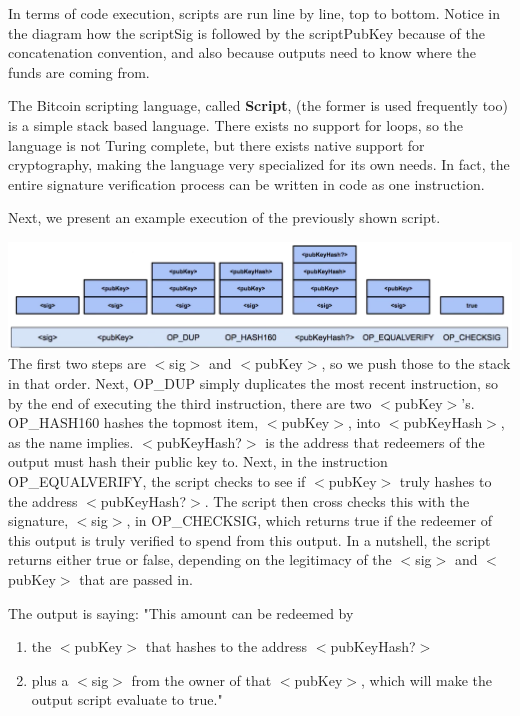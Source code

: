 \documentclass[full.tex]{subfiles}
\begin{document}
  In terms of code execution, scripts are run line by line, top to bottom. Notice in the diagram how the scriptSig is followed by the scriptPubKey because of the concatenation convention, and also because outputs need to know where the funds are coming from. 
  
  The Bitcoin scripting language, called \textbf{Script}, (the former is used frequently too) is a simple stack based language. There exists no support for loops, so the language is not Turing complete, but there exists native support for cryptography, making the language very specialized for its own needs. In fact, the entire signature verification process can be written in code as one instruction.
  
  Next, we present an example execution of the previously shown script. 

\includegraphics[scale=0.2]{script_execution} \\

 The first two steps are $<$sig$>$ and $<$pubKey$>$, so we push those to the stack in that order. Next, OP\_DUP simply duplicates the most recent instruction, so by the end of executing the third instruction, there are two $<$pubKey$>$'s. OP\_HASH160 hashes the topmost item, $<$pubKey$>$, into $<$pubKeyHash$>$, as the name implies. $<$pubKeyHash?$>$ is the address that redeemers of the output must hash their public key to. Next, in the instruction OP\_EQUALVERIFY, the script checks to see if $<$pubKey$>$ truly hashes to the address $<$pubKeyHash?$>$. The script then cross checks this with the signature, $<$sig$>$, in OP\_CHECKSIG, which returns true if the redeemer of this output is truly verified to spend from this output. In a nutshell, the script returns either true or false, depending on the legitimacy of the $<$sig$>$ and $<$pubKey$>$ that are passed in. 
 
 The output is saying: "This amount can be redeemed by
 \begin{enumerate}
     \item the $<$pubKey$>$ that hashes to the address $<$pubKeyHash?$>$
     \item plus a $<$sig$>$ from the owner of that $<$pubKey$>$, which will make the output script evaluate to true."
 \end{enumerate}
 
\end{document}
